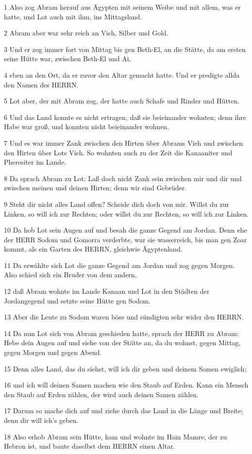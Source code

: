 \par 1 Also zog Abram herauf aus Ägypten mit seinem Weibe und mit allem, was er hatte, und Lot auch mit ihm, ins Mittagsland.
\par 2 Abram aber war sehr reich an Vieh, Silber und Gold.
\par 3 Und er zog immer fort von Mittag bis gen Beth-El, an die Stätte, da am ersten seine Hütte war, zwischen Beth-El und Ai,
\par 4 eben an den Ort, da er zuvor den Altar gemacht hatte. Und er predigte allda den Namen des HERRN.
\par 5 Lot aber, der mit Abram zog, der hatte auch Schafe und Rinder und Hütten.
\par 6 Und das Land konnte es nicht ertragen, daß sie beieinander wohnten; denn ihre Habe war groß, und konnten nicht beieinander wohnen.
\par 7 Und es war immer Zank zwischen den Hirten über Abrams Vieh und zwischen den Hirten über Lots Vieh. So wohnten auch zu der Zeit die Kanaaniter und Pheresiter im Lande.
\par 8 Da sprach Abram zu Lot: Laß doch nicht Zank sein zwischen mir und dir und zwischen meinen und deinen Hirten; denn wir sind Gebrüder.
\par 9 Steht dir nicht alles Land offen? Scheide dich doch von mir. Willst du zur Linken, so will ich zur Rechten; oder willst du zur Rechten, so will ich zur Linken.
\par 10 Da hob Lot sein Augen auf und besah die ganze Gegend am Jordan. Denn ehe der HERR Sodom und Gomorra verderbte, war sie wasserreich, bis man gen Zoar kommt, als ein Garten des HERRN, gleichwie Ägyptenland.
\par 11 Da erwählte sich Lot die ganze Gegend am Jordan und zog gegen Morgen. Also schied sich ein Bruder von dem andern,
\par 12 daß Abram wohnte im Lande Kanaan und Lot in den Städten der Jordangegend und setzte seine Hütte gen Sodom.
\par 13 Aber die Leute zu Sodom waren böse und sündigten sehr wider den HERRN.
\par 14 Da nun Lot sich von Abram geschieden hatte, sprach der HERR zu Abram: Hebe dein Augen auf und siehe von der Stätte an, da du wohnst, gegen Mittag, gegen Morgen und gegen Abend.
\par 15 Denn alles Land, das du siehst, will ich dir geben und deinem Samen ewiglich;
\par 16 und ich will deinen Samen machen wie den Staub auf Erden. Kann ein Mensch den Staub auf Erden zählen, der wird auch deinen Samen zählen.
\par 17 Darum so mache dich auf und ziehe durch das Land in die Länge und Breite; denn dir will ich's geben.
\par 18 Also erhob Abram sein Hütte, kam und wohnte im Hain Mamre, der zu Hebron ist, und baute daselbst dem HERRN einen Altar.

